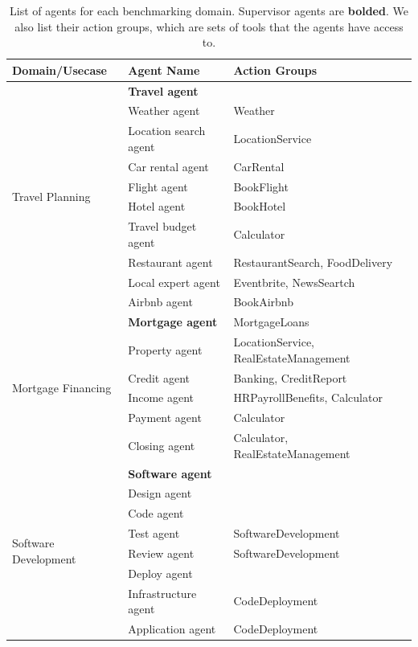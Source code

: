 \begin{table}[H]
    \caption{List of agents for each benchmarking domain. Supervisor agents are \textbf{bolded}. We also list their action groups, which are sets of tools that the agents have access to.}
    \label{tab:agent_profiles}
    \centering
    \footnotesize
    \begin{tabular}{p{3cm}p{3cm}p{6cm}}
    \toprule
    Domain/Usecase & Agent Name & Action Groups \\
    \midrule
    \multirow{10}{*}{Travel Planning} & \textbf{Travel agent} & \\
    & Weather agent & Weather \\
    & Location search agent & LocationService \\
    & Car rental agent & CarRental \\
    & Flight agent & BookFlight \\
    & Hotel agent & BookHotel \\
    & Travel budget agent & Calculator \\
    & Restaurant agent & RestaurantSearch,  FoodDelivery \\
    & Local expert agent & Eventbrite, NewsSeartch \\
    & Airbnb agent & BookAirbnb \\
    \midrule 
    \multirow{6}{*}{Mortgage Financing} & \textbf{Mortgage agent} & MortgageLoans \\
    & Property agent & LocationService, RealEstateManagement \\
    & Credit agent & Banking, CreditReport \\
    & Income agent & HRPayrollBenefits, Calculator \\
    & Payment agent & Calculator \\
    & Closing agent & Calculator, RealEstateManagement \\
    \midrule
    \multirow{8}{*}{Software Development} & \textbf{Software agent} & \\
    & Design agent & \\
    & Code agent & \\
    & Test agent & SoftwareDevelopment \\
    & Review agent & SoftwareDevelopment \\
    & Deploy agent & \\
    & Infrastructure agent &  CodeDeployment\\
    & Application agent & CodeDeployment \\
    \bottomrule
    \end{tabular}
\end{table}


